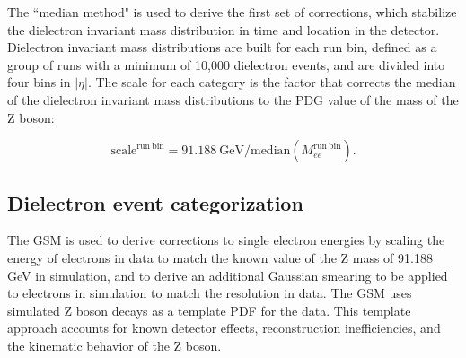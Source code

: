 The ``median method" is used to derive the first set of corrections, which stabilize the dielectron invariant mass distribution in time and location in the detector. Dielectron invariant mass distributions are built for each run bin, defined as a group of runs with a minimum of 10,000 dielectron events, and are divided into four bins in $|\eta|$. The scale for each category is the factor that corrects the median of the dielectron invariant mass distributions to the PDG value of the mass of the Z boson:

\begin{equation}
    \mathrm{scale}^{\mathrm{run\ bin}} = 91.188 \mathrm{\ GeV} / \text{median}(M_{ee}^{\mathrm{run\ bin}}).
\end{equation}

\subsection{Dielectron event categorization}

The GSM is used to derive corrections to single electron energies by scaling the energy of electrons in data to match the known value of the Z mass of 91.188 GeV \cite{pdg} in simulation, and to derive an additional Gaussian smearing to be applied to electrons in simulation to match the resolution in data. The GSM uses simulated Z boson decays as a template PDF for the data. This template approach accounts for known detector effects, reconstruction inefficiencies, and the kinematic behavior of the Z boson.

